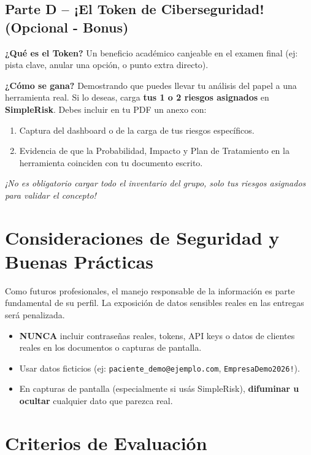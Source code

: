 \documentclass[11pt,a4paper]{article}
\begin{document}
\subsection{Parte D -- ¡El Token de Ciberseguridad! (Opcional - Bonus)}
\begin{tokenbox}
\textbf{¿Qué es el Token?} Un beneficio académico canjeable en el examen final (ej: pista clave, anular una opción, o punto extra directo).

\textbf{¿Cómo se gana?} Demostrando que puedes llevar tu análisis del papel a una herramienta real. Si lo deseas, carga \textbf{tus 1 o 2 riesgos asignados} en \textbf{SimpleRisk}. Debes incluir en tu PDF un anexo con:
\begin{enumerate}
    \item Captura del dashboard o de la carga de tus riesgos específicos.
    \item Evidencia de que la Probabilidad, Impacto y Plan de Tratamiento en la herramienta coinciden con tu documento escrito.
\end{enumerate}
\textit{¡No es obligatorio cargar todo el inventario del grupo, solo tus riesgos asignados para validar el concepto!}
\end{tokenbox}

\section{Consideraciones de Seguridad y Buenas Prácticas}

\begin{warningbox}
Como futuros profesionales, el manejo responsable de la información es parte fundamental de su perfil. La exposición de datos sensibles reales en las entregas será penalizada.
\end{warningbox}

\begin{itemize}
    \item \textbf{NUNCA} incluir contraseñas reales, tokens, API keys o datos de clientes reales en los documentos o capturas de pantalla.
    \item Usar datos ficticios (ej: \texttt{paciente\_demo@ejemplo.com}, \texttt{EmpresaDemo2026!}).
    \item En capturas de pantalla (especialmente si usás SimpleRisk), \textbf{difuminar u ocultar} cualquier dato que parezca real.
\end{itemize}

\section{Criterios de Evaluación}
\end{document}
